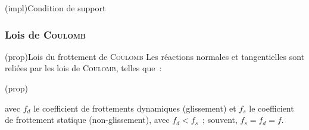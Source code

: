 \documentclass[../../main/main.tex]{subfiles}
\begin{document}
\begin{tcb*}[bld](impl){Condition de support}
	\begin{center}
	\end{center}
\end{tcb*}

\subsubsection{Lois de \textsc{Coulomb}}

\begin{tcb*}(prop){Lois du frottement de \textsc{Coulomb}}
	Les réactions normales et tangentielles sont reliées par les lois de
	\textsc{Coulomb}, telles que~:
	\smallbreak
	\begin{isd}(prop)
		\vspace{-15pt}
		\tcblower
		\psw{%
			\[
				\norm{\Tf} = f_d \norm{\Nf}
			\]
		}%
		\vspace{-15pt}
	\end{isd}
	avec $f_d$ le coefficient de frottements dynamiques (glissement) et
	$f_s$ le coefficient de frottement statique (non-glissement), avec $f_d <
		f_s$~; souvent, $f_s = f_d = f$.
\end{tcb*}
\end{document}
